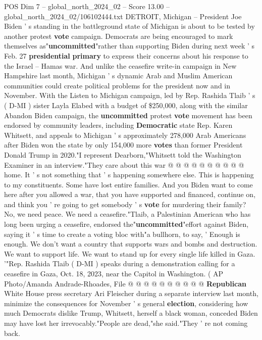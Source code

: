 \begin{textsample}{POS Dim 7 – global\_north\_2024\_02 – Score 13.00 – global\_north\_2024\_02/106102444.txt}  \label{ex:f7_pos_030}
DETROIT, Michigan -- President Joe Biden ' s standing in the battleground state of Michigan is about to be tested by another protest \textbf{vote} campaign.
Democrats are being encouraged to mark themselves as"\textbf{uncommitted}"rather than supporting Biden during next week ' s Feb. 27 \textbf{presidential} \textbf{primary} to express their concerns about his response to the Israel -- Hamas war.
And unlike the ceasefire write-in campaign in New Hampshire last month, Michigan ' s dynamic Arab and Muslim American communities could create political problems for the president now and in November.
With the Listen to Michigan campaign, led by Rep.
Rashida Tlaib ' s ( D-MI ) sister Layla Elabed with a budget of \$250,000, along with the similar Abandon Biden campaign, the \textbf{uncommitted} protest \textbf{vote} movement has been endorsed by community leaders, including \textbf{Democratic} state Rep.
Karen Whitsett, and appeals to Michigan ' s approximately 278,000 Arab Americans after Biden won the state by only 154,000 more \textbf{votes} than former President Donald Trump in 2020."I represent Dearborn,"Whitsett told the Washington Examiner in an interview."They care about this war @ @ @ @ @ @ @ @ @ @ home.
It ' s not something that ' s happening somewhere else.
This is happening to my constituents.
Some have lost entire families.
And you Biden want to come here after you allowed a war, that you have supported and financed, continue on, and think you ' re going to get somebody ' s \textbf{vote} for murdering their family?
No, we need peace.
We need a ceasefire."Tlaib, a Palestinian American who has long been urging a ceasefire, endorsed the"\textbf{uncommitted}"effort against Biden, saying it ' s time to create a voting bloc with"a bullhorn, to say, ' Enough is enough.
We don't want a country that supports wars and bombs and destruction.
We want to support life.
We want to stand up for every single life killed in Gaza. '"Rep.
Rashida Tlaib ( D-MI ) speaks during a demonstration calling for a ceasefire in Gaza, Oct. 18, 2023, near the Capitol in Washington. ( AP Photo/Amanda Andrade-Rhoades, File @ @ @ @ @ @ @ @ @ @ \textbf{Republican} White House press secretary Ari Fleischer during a separate interview last month, minimize the consequences for November ' s general \textbf{election}, considering how much Democrats dislike Trump, Whitsett, herself a black woman, conceded Biden may have lost her irrevocably."People are dead,"she said."They ' re not coming back.

\end{textsample}
